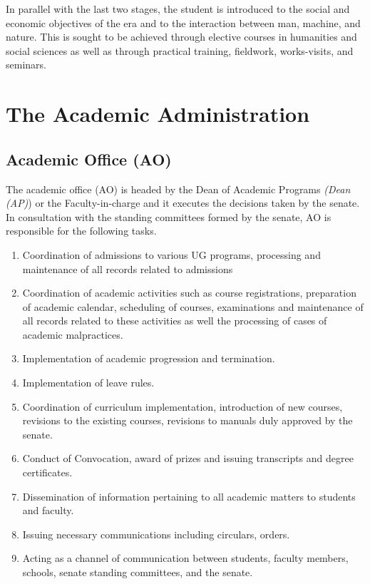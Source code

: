 \documentclass[a4paper, 12pt]{article}
\begin{document}
	In parallel with the last two stages, the student is introduced to the social and economic objectives of the era and to the interaction between man, machine, and nature. This is sought to be achieved through elective courses in humanities and social sciences as well as through practical training, fieldwork, works-visits, and seminars. 


\section{The Academic Administration}

\subsection{Academic Office (AO)}

The academic office (AO) is headed by the Dean of Academic Programs \textit{(Dean (AP)}) or the Faculty-in-charge and it executes the decisions taken by the senate. In consultation with the standing committees formed by the senate, AO is responsible for the following tasks.

\begin{enumerate}
	\item Coordination of admissions to various UG programs, processing and maintenance of all records related to admissions
	\item Coordination of academic activities such as course registrations, preparation of academic calendar, scheduling of courses, examinations and maintenance of all records related to these activities as well the processing of cases of academic malpractices.
	\item Implementation of academic progression and termination.
	\item Implementation of leave rules.
	\item Coordination of curriculum implementation, introduction of new courses, revisions to the existing courses, revisions to manuals duly approved by the senate.
	\item Conduct of Convocation, award of prizes and issuing transcripts and degree certificates.
	\item Dissemination of information pertaining to all academic matters to students and faculty.
	\item Issuing necessary communications including circulars, orders. 
	\item Acting as a channel of communication between students, faculty members, schools, senate standing committees, and the senate.
\end{enumerate}
\end{document}
